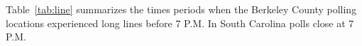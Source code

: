 Table~\ref{tab:line} summarizes the times periods when the Berkeley County polling locations experienced long lines before 7 P.M.  In South Carolina polls close at 7 P.M.

